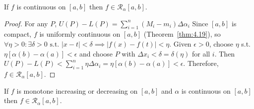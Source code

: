 \begin{thm}[8]
	If $f$ is continuous on $[a,b]$ then $f \in \mathscr{R}_{\alpha}[a,b]$.
	\begin{proof}
		For any $P$, $U(P)-L(P)=\sum_{i=1}^{n}{(M_i - m_i) \Delta \alpha_i}$
		Since $[a,b]$ is compact, $f$ is uniformly continuous on $[a,b]$ (Theorem~\ref{thm:4.19}), so $\forall{\eta > 0}: \exists{\delta > 0} \text{ s.t. } |x-t|<\delta \implies |f(x)-f(t)|<\eta$.
		Given $\epsilon > 0$, choose $\eta$ s.t. $\eta[\alpha(b)-\alpha(a)]<\epsilon$ and choose $P$ with $\Delta x_i<\delta=\delta(\eta)$ for all $i$.
		Then $U(P)-L(P)<\sum_{i=1}^{n}{\eta \Delta \alpha_i }=\eta[\alpha(b)-\alpha(a)]<\epsilon$.
		Therefore, $f \in \mathscr{R}_{\alpha}[a,b]$.
	\end{proof}
\end{thm}

\begin{thm}[9]
	If $f$ is monotone increasing or decreasing on $[a,b]$ and $\alpha$ is continuous on $[a,b]$ then $f \in \mathscr{R}_{\alpha}[a,b]$.
\end{thm}

